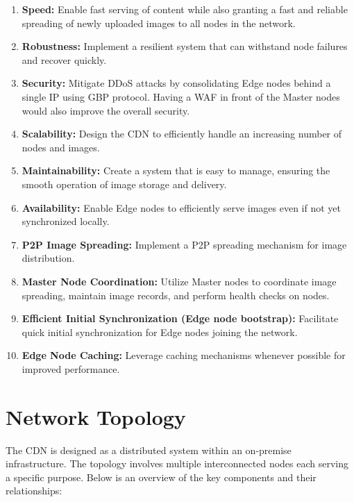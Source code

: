 \documentclass{article}
\begin{document}
  \begin{enumerate}[label=\arabic*.]
    \item \textbf{Speed:} Enable fast serving of content while also granting a fast and reliable spreading of newly
    uploaded images to all nodes in the network.

    \item \textbf{Robustness:} Implement a resilient system that can withstand node failures and recover quickly.

    \item \textbf{Security:} Mitigate DDoS attacks by consolidating Edge nodes behind a single IP using GBP protocol.
    Having a WAF in front of the Master nodes would also improve the overall security.

    \item \textbf{Scalability:} Design the CDN to efficiently handle an increasing number of nodes and images.

    \item \textbf{Maintainability:} Create a system that is easy to manage, ensuring the smooth operation of image
    storage and delivery.

    \item \textbf{Availability:} Enable Edge nodes to efficiently serve images even if not yet synchronized locally.

    \item \textbf{P2P Image Spreading:} Implement a P2P spreading mechanism for image distribution.

    \item \textbf{Master Node Coordination:} Utilize Master nodes to coordinate image spreading, maintain image records,
    and perform health checks on nodes.

    \item \textbf{Efficient Initial Synchronization (Edge node bootstrap):} Facilitate quick initial synchronization
    for Edge nodes joining the network.

    \item \textbf{Edge Node Caching:} Leverage caching mechanisms whenever possible  for improved performance.
  \end{enumerate}





  \newpage







  \section{Network Topology}
  The CDN is designed as a distributed system within an on-premise infrastructure.
  The topology involves multiple interconnected nodes each serving a specific purpose.
  Below is an overview of the key components and their relationships:
\end{document}
